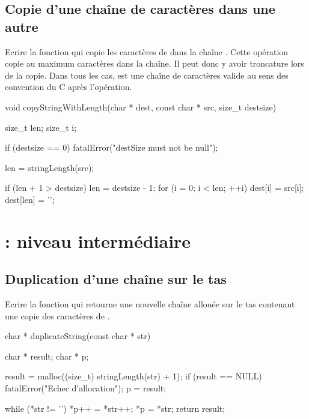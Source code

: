 \subsection{Copie d'une chaîne de caractères dans une autre}

Ecrire la fonction  qui copie les caractères de  dans la chaîne . Cette opération copie au maximum  caractères dans la chaîne. Il peut donc y avoir troncature lors de la copie. Dans tous les cas,  est une chaîne de  caractères valide au sens des convention du C après l'opération.

\begin{csourcecorrection}
void copyStringWithLength(char * dest, const char * src, size_t destsize) {
    size_t len;
    size_t i;

    if (destsize == 0)
        fatalError("destSize must not be null");

    len = stringLength(src);

    if (len + 1 > destsize)
        len = destsize - 1;
    for (i = 0; i < len; ++i)
        dest[i] = src[i];
    dest[len] = '\0';
}
\end{csourcecorrection}

\section{ : niveau intermédiaire}

\subsection{Duplication d'une chaîne sur le tas}

Ecrire la fonction  qui retourne une nouvelle chaîne allouée sur le tas contenant une copie des caractères de .

\begin{csourcecorrection}
char * duplicateString(const char * str) {
    char * result;
    char * p;

    result = malloc((size_t) stringLength(str) + 1);
    if (result == NULL)
        fatalError("Echec d'allocation");
    p = result;

    while (*str != '\0')
        *p++ = *str++;
    *p = *str;
    return result;
}
\end{csourcecorrection}

